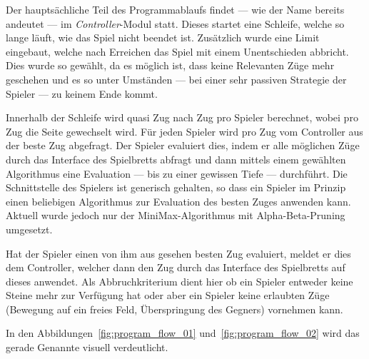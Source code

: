 Der hauptsächliche Teil des Programmablaufs findet --- wie der Name bereits andeutet --- im \textit{Controller}-Modul statt. Dieses startet eine Schleife, welche so lange läuft, wie das Spiel nicht beendet ist. Zusätzlich wurde eine Limit eingebaut, welche nach Erreichen das Spiel mit einem Unentschieden abbricht. Dies wurde so gewählt, da es möglich ist, dass keine Relevanten Züge mehr geschehen und es so unter Umständen --- bei einer sehr passiven Strategie der Spieler --- zu keinem Ende kommt.

Innerhalb der Schleife wird quasi Zug nach Zug pro Spieler berechnet, wobei pro Zug die Seite gewechselt wird. Für jeden Spieler wird pro Zug vom Controller aus der beste Zug abgefragt. Der Spieler evaluiert dies, indem er alle möglichen Züge durch das Interface des Spielbretts abfragt und dann mittels einem gewählten Algorithmus eine Evaluation --- bis zu einer gewissen Tiefe --- durchführt. Die Schnittstelle des Spielers ist generisch gehalten, so dass ein Spieler im Prinzip einen beliebigen Algorithmus zur Evaluation des besten Zuges anwenden kann. Aktuell wurde jedoch nur der MiniMax-Algorithmus mit Alpha-Beta-Pruning umgesetzt.

Hat der Spieler einen von ihm aus gesehen besten Zug evaluiert, meldet er dies dem Controller, welcher dann den Zug durch das Interface des Spielbretts auf dieses anwendet. Als Abbruchkriterium dient hier ob ein Spieler entweder keine Steine mehr zur Verfügung hat oder aber ein Spieler keine erlaubten Züge (Bewegung auf ein freies Feld, Überspringung des Gegners) vornehmen kann.

In den Abbildungen~\ref{fig:program_flow_01} und~\ref{fig:program_flow_02} wird das gerade Genannte visuell verdeutlicht.

\newpage

